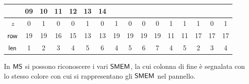 \begin{esempio}
\begin{table}[H]
\begin{tabular}{c|ccccccccccccccc}
      &  {\color{nordred}09} & 10 &  {\color{nordgreen}11} & 12 & 13
      &  {\color{nordpurple}14} \\
      \hline
      \hline
      $z$ & 0 & 1 & 0 & 0 & 1 &  {\color{nordcyan}0} & 1 & 0 & 0
      &  {\color{nordred}0} & 1 &  {\color{nordgreen}1} & 1 & 0
      &  {\color{nordpurple}1} \\
      \hline
      $\mbox{\rm {\sf row}}$ & 19 & 19 & 16 & 15 & 13 &  {\color{nordcyan}13} & 19 & 19 & 19
      &  {\color{nordred}19} & 11 &  {\color{nordgreen}11} & 17 & 17
      &  {\color{nordpurple}17} \\
      $\mbox{\rm {\sf len}}$ & 1 & 2 & 3 & 4 & 5 & {\color{nordcyan}6} & 4 & 5 & 6
      & {\color{nordred}7} & 4 & {\color{nordgreen}5} & 2 & 3
      & {\color{nordpurple}4}\\
    \end{tabular}
  \end{table}
  \noindent
  In $\mbox{\rm {\sf MS}}$ si possono riconoscere i vari $\mbox{\rm {\sf SMEM}}$, la cui colonna di fine è
  segnalata con lo stesso colore con cui si rappresentano gli $\mbox{\rm {\sf SMEM}}$ nel
  pannello. 
\end{esempio}
